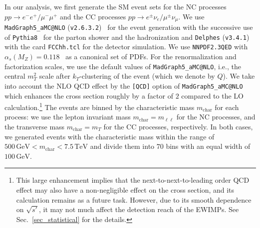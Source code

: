 \documentclass[12pt,twoside,book]{article}
\begin{document}
In our analysis, we first generate the SM event sets for the NC processes $pp\to e^{-}e^{+} / \mu^{-}\mu^{+}$ and the CC processes $pp\to e^{\pm}\nu_e / \mu^{\pm}\nu_\mu$.
We use \texttt{MadGraph5\_aMC@NLO} (\texttt{v2.6.3.2})~\cite{Alwall:2011uj, Alwall:2014hca} for the event generation with the successive use of \texttt{Pythia8}~\cite{Sjostrand:2014zea} for the parton shower and the hadronization and \texttt{Delphes} (\texttt{v3.4.1})~\cite{deFavereau:2013fsa} with the card {\tt FCChh.tcl} for the detector simulation.
We use \texttt{NNPDF2.3QED} with $\alpha_s (M_Z) = 0.118$~\cite{Ball:2013hta} as a canonical set of PDFs.
For the renormalization and factorization scales, we use the default values of \texttt{MadGraph5\_aMC@NLO}, i.e., the central $m_T^2$ scale after $k_T$-clustering of the event (which we denote by $Q$).
We take into account the NLO QCD effect by the \verb|[QCD]| option of \verb|MadGraph5_aMC@NLO| which enhances the cross section roughly by a factor of $2$ compared to the LO calculation.\footnote
{
  This large enhancement implies that the next-to-next-to-leading order QCD effect may also have a non-negligible effect on the cross section, and its calculation remains as a future task.
  However, due to its smooth dependence on $\sqrt{s'}$, it may not much affect the detection reach of the EWIMPs.
  See Sec.~\ref{sec_statistical} for the details.
}
The events are binned by the characteristic mass $m_{\mathrm{char}}$ for each process: we use the lepton invariant mass $m_{\mathrm{char}} = m_{\ell\ell}$ for the NC processes, and the transverse mass $m_{\mathrm{char}} = m_T$ for the CC processes, respectively.
In both cases, we generated events with the characteristic mass within the range of $500\,\mathrm{GeV} < m_\mathrm{char} < 7.5\,\mathrm{TeV}$ and divide them into $70$ bins with an equal width of $100\,\mathrm{GeV}$.
\end{document}
